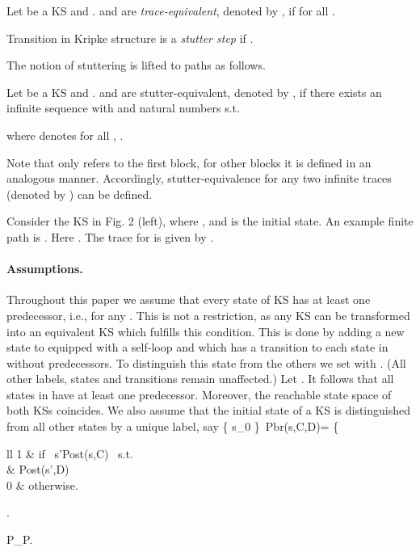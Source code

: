 \documentclass{llncs}
\renewcommand{\emptyset}{\varnothing}
\newcommand{\<}{\langle}
\renewcommand{\>}{\rangle}
\begin{document}
\begin{definition}
Let  be a KS and  .  and  are \emph{trace-equivalent}, denoted by , if  for all . 
\end{definition}
\begin{definition}
Transition  in Kripke structure  is a \emph{stutter step} if .  
\end{definition}
The notion of stuttering is lifted to paths as follows.
\begin{definition}
Let  be a KS and  .  and  are stutter-equivalent, denoted by , if there exists an infinite sequence  with  and natural numbers   s.t. 

   
where  denotes for all , .       
\end{definition}
Note that  only refers to the first block, for other blocks it is defined in an analogous manner. Accordingly, stutter-equivalence for any two infinite traces  (denoted by ) can be defined. 
\begin{example}
Consider the KS  in Fig. 2 (left), where ,  and  is the initial state. An example finite path  is . Here . The trace for  is given by . 
\end{example}

\paragraph{Assumptions.}
Throughout this paper we assume that every state of KS  has at least one predecessor, i.e.,  for any . 
This is not a restriction, as any KS  can be transformed into an equivalent KS  which fulfills this condition.
This is done by adding a new state  to  equipped with a self-loop and which has a transition to each state in  without predecessors.
To distinguish this state from the others we set  with .
(All other labels, states and transitions remain unaffected.) Let .
It follows that all states in  have at least one predecessor.
Moreover, the reachable state space of both KSs coincides.
We also assume that the initial state  of a KS is distinguished from all other states by a unique label, say \{ s_0 \}\
Pbr(s,C,D)=
\left\{\begin{array}{ll}
1 & \mbox{if } \exists s'\in Post(s,C) \mbox{ s.t. } \\ 
  & Post(s',D)\neq \emptyset\\ 
0 & \mbox{otherwise.} 
\end{array}\right.

\models P\Leftrightarrow {}_{}\models P. 
\end{document}

